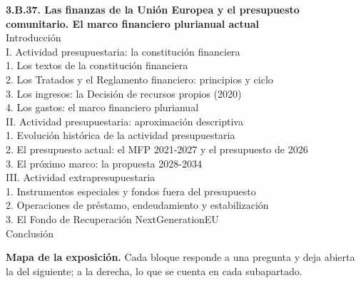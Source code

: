 \documentclass[11pt]{article}
\begin{document}
\begin{esquema}[unbreakable]
\textbf{3.B.37. Las finanzas de la Unión Europea y el presupuesto comunitario. El marco financiero plurianual actual}\\[2pt]
Introducción\\
I. Actividad presupuestaria: la constitución financiera\\
\hspace*{1.5em}1. Los textos de la constitución financiera\\
\hspace*{1.5em}2. Los Tratados y el Reglamento financiero: principios y ciclo\\
\hspace*{1.5em}3. Los ingresos: la Decisión de recursos propios (2020)\\
\hspace*{1.5em}4. Los gastos: el marco financiero plurianual\\
II. Actividad presupuestaria: aproximación descriptiva\\
\hspace*{1.5em}1. Evolución histórica de la actividad presupuestaria\\
\hspace*{1.5em}2. El presupuesto actual: el MFP 2021-2027 y el presupuesto de 2026\\
\hspace*{1.5em}3. El próximo marco: la propuesta 2028-2034\\
III. Actividad extrapresupuestaria\\
\hspace*{1.5em}1. Instrumentos especiales y fondos fuera del presupuesto\\
\hspace*{1.5em}2. Operaciones de préstamo, endeudamiento y estabilización\\
\hspace*{1.5em}3. El Fondo de Recuperación NextGenerationEU\\
Conclusión
\end{esquema}

\begin{anotaciones}
\textbf{Mapa de la exposición.} Cada bloque responde a una pregunta y deja abierta la del siguiente; a la derecha, lo que se cuenta en cada subapartado.
\begin{infografiacaja}
\caption{Mapa del tema: la pregunta de cada bloque y el hilo que los une}\label{figu:mapa-tema}
\end{infografiacaja}
\end{anotaciones}
\end{document}
